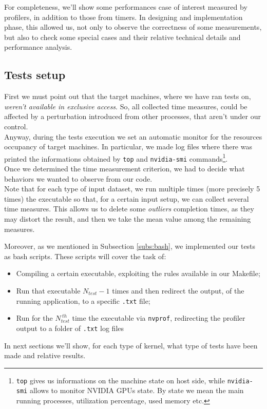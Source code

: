 For completeness, we'll show some performances case of interest measured by profilers, in addition to those from timers.
In designing and implementation phase, this allowed us, not only to observe the correctness of some measurements, but also to check some special cases and their relative technical details and performance analysis.


\subsection{Tests setup}
First we must point out that the target machines, where we have ran tests on, \textit{weren't available in exclusive access}. So, all collected time measures, could be affected by a perturbation introduced from other processes, that aren't under our control.\\
Anyway, during the tests execution we set an automatic monitor for the resources occupancy of target machines. In particular, we made log files where there was printed the informations obtained by \texttt{top} and \texttt{nvidia-smi} commands\footnote{\texttt{top} gives us informations on the machine state on host side, while \texttt{nvidia-smi} allows to monitor NVIDIA GPUs state. By state we mean the main running processes, utilization percentage, used memory etc.}.\\

Once we determined the time measurement criterion, we had to decide what behaviors we wanted to observe from our code.\\%
Note that for each type of input dataset, we run multiple times (more precisely 5 times) the executable so that, for a certain input setup, we can collect several time measures. This allows us to delete some \textit{outliers} completion times, as they may distort the result, and then we take the mean value among the remaining measures.

Moreover, as we mentioned in Subsection \ref{subs:bash}, we implemented our tests as bash scripts.
These scripts will cover the task of:
\begin{itemize}
	\item Compiling a certain executable, exploiting the rules available in our Makefile;
	\item Run that executable \(N_{test} - 1\) times and then redirect the output, of the running application, to a specific \texttt{.txt} file;
	\item Run for the \(N_{test}^{\ th}\) time the executable via \texttt{nvprof}, redirecting the profiler output to a folder of \texttt{.txt} log files
\end{itemize} 
In next sections we'll show, for each type of kernel, what type of tests have been made and relative results.

